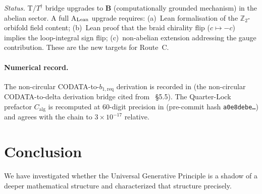 \documentclass[11pt]{article}
\theoremstyle{remark}
\newcommand{\bonereq}{b_{1,\mathrm{req}}}
\newcommand{\Calg}{C_{\mathrm{alg}}}
\begin{document}
\textit{Status.}
T/$T^\dagger$ bridge upgrades to \textbf{B} (computationally grounded
mechanism) in the abelian sector.  A full A$_{\rm Lean}$ upgrade requires:
(a)~Lean formalisation of the $\mathbb{Z}_2$-orbifold field content;
(b)~Lean proof that the braid chirality flip ($c \mapsto -c$) implies the
loop-integral sign flip; (c)~non-abelian extension addressing the gauge
contribution.  These are the new targets for Route~C.

\paragraph{Numerical record.}
The non-circular CODATA-to-$\bonereq$ derivation is recorded in
 (the non-circular CODATA-to-delta derivation
bridge cited from~\cite{Spivack2026_SM_UGP} \S5.5).  The Quarter-Lock
prefactor $\Calg$ is recomputed at $60$-digit precision in
(pre-commit hash \texttt{a0e8debe\ldots}) and agrees with the chain to
$3{\times}10^{-17}$ relative.

\section{Conclusion}
\label{sec:conclusion}

We have investigated whether the Universal Generative Principle is a shadow of a deeper
mathematical structure and characterized that structure precisely.
\end{document}

